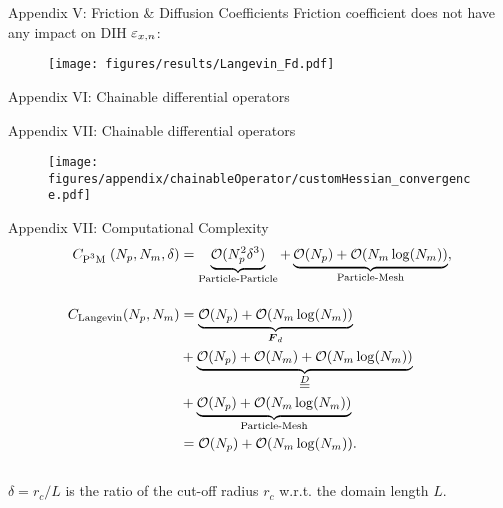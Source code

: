 \begin{frame}{Appendix V: Friction \& Diffusion Coefficients}
    Friction coefficient does not have any impact on DIH $\varepsilon_{x,n}$:
    \begin{figure}[h]
        \texttt{[image: figures/results/Langevin\_Fd.pdf]}
        \label{fig:Fd_DIH}
    \end{figure}
\end{frame}

\begin{frame}[fragile]{Appendix VI: Chainable differential operators}
    
\end{frame}

\begin{frame}{Appendix VII: Chainable differential operators}
    \begin{figure}
        \begin{center}
            \texttt{[image: figures/appendix/chainableOperator/customHessian\_convergence.pdf]}
        \end{center}
        \label{fig:customHessian_convergence}
    \end{figure}
\end{frame}

\begin{frame}{Appendix VII: Computational Complexity}
\begin{align}
    C_{\text{P\textsuperscript{3}M\ }}(N_p, N_m, \delta) &= \underbrace{\mathcal O( N_p^2 \delta^3)}_{\text{Particle-Particle}}
    + \underbrace{\mathcal O(N_p) 
    + \mathcal O(N_m \log(N_m))}_{\text{Particle-Mesh}}, \\[13pt]
    \nonumber
    C_{\text{Langevin}}(N_p, N_m) &= \underbrace{\mathcal O(N_p) + \mathcal O(N_m \log(N_m))}_{\text{$\boldsymbol{F}_d$}} \\ \nonumber
                                          &+ \underbrace{\mathcal O(N_p) + \mathcal O(N_m) +
                                          \mathcal O(N_m \log(N_m))}_{\text{$\underline{\underline{D}}$}} \\ \nonumber
                                          &+ \underbrace{\mathcal O(N_p) + \mathcal O(N_m \log(N_m))}_{\text{Particle-Mesh}} \\
    &= \mathcal O(N_p) + \mathcal O(N_m \log(N_m)). 
\end{align}
\\
$\delta = r_c / L$ is the ratio of the cut-off radius $r_c$ w.r.t. the domain length $L$.

\end{frame}

